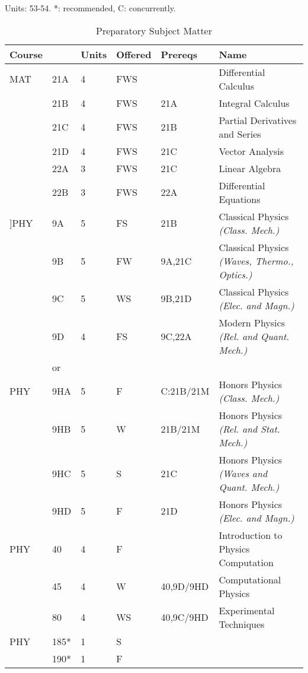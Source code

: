 \documentclass[12pt]{article}
\begin{document}
\begin{table}
\caption{\label{tbl:prep}Preparatory Subject Matter}
\noindent
\vskip 0.25cm
Units:  53-54. *: recommended, C: concurrently.\\
\begin{tabular}{|llllll|}
\hline
Course & & Units & Offered & Prereqs & Name \\
\hline
MAT & 21A & 4 & FWS & & Differential Calculus\\ 
    & 21B & 4 & FWS & 21A & Integral Calculus \\ 
    & 21C & 4 & FWS & 21B & Partial Derivatives and Series\\ 
    & 21D & 4 & FWS & 21C & Vector Analysis\\ 
    & 22A & 3 & FWS & 21C & Linear Algebra\\ 
    & 22B & 3 & FWS & 22A & Differential Equations\\ 
\hline
\hline

]PHY & 9A & 5 & FS & 21B & Classical Physics {\it (Class. Mech.)}\\ 
    & 9B & 5 & FW & 9A,21C & Classical Physics {\it (Waves, Thermo., Optics.)}\\ 
    & 9C & 5 & WS & 9B,21D & Classical Physics {\it (Elec. and Magn.)}\\ 
    & 9D & 4 & FS & 9C,22A & Modern Physics {\it (Rel. and Quant. Mech.)}\\ 
\hline
&or&&\\
\hline
PHY & 9HA & 5 & F & C:21B/21M & Honors Physics {\it (Class. Mech.)}\\ 
    & 9HB & 5 & W & 21B/21M & Honors Physics {\it (Rel. and Stat. Mech.)}\\ 
    & 9HC & 5 & S & 21C & Honors Physics {\it (Waves and Quant. Mech.)}\\ 
    & 9HD & 5 & F & 21D & Honors Physics {\it (Elec. and Magn.)}\\ 
\hline
\hline
PHY & 40  & 4 & F & & Introduction to Physics Computation \\ 
    & 45  & 4 & W & 40,9D/9HD     & Computational Physics\\ 
    & 80  & 4 & WS & 40,9C/9HD     & Experimental Techniques \\
PHY & 185* & 1 & S & & \\ 
    & 190* & 1 & F & & \\ 
\hline
\end{tabular}
\end{table}
\end{document}
